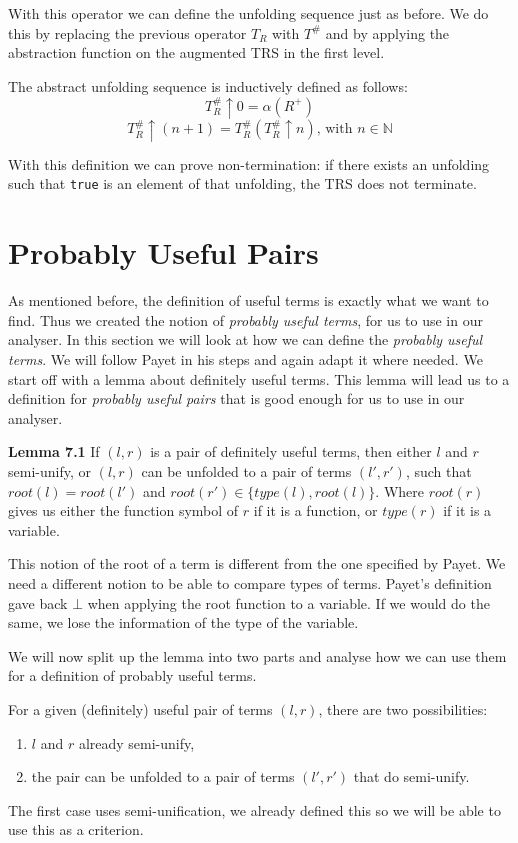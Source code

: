 With this operator we can define the unfolding sequence just as before. We do this by replacing the previous operator $T_R$ with $T^{\#}$ and by applying the abstraction function on the augmented TRS in the first level. 
\begin{definition}
The abstract unfolding sequence is inductively defined as follows:
$$T^{\#}_R \uparrow 0 = \alpha(R^+)$$
$$T^{\#}_R \uparrow (n+1) = T^{\#}_R(T^{\#}_R \uparrow n)\text{, with }n \in \mathbb{N}$$ 
\end{definition}

With this definition we can prove non-termination: if there exists an unfolding such that \texttt{true} is an element of that unfolding, the TRS does not terminate. 

\section{Probably Useful Pairs}
As mentioned before, the definition of useful terms is exactly what we want to find. Thus we created the notion of \textit{probably useful terms}, for us to use in our analyser. In this section we will look at how we can define the \textit{probably useful terms}. We will follow Payet in his steps and again adapt it where needed. We start off with a lemma about definitely useful terms. This lemma will lead us to a definition for \textit{probably useful pairs} that is good enough for us to use in our analyser. 

\textbf{Lemma 7.1} If $(l, r)$ is a pair of definitely useful terms, then either $l$ and $r$ semi-unify, or $(l, r)$ can be unfolded to a pair of terms $(l', r')$, such that $\textit{root}(l) = \textit{root}(l')$ and $\textit{root}(r') \in \{ \textit{type}(l), \textit{root}(l) \}$. Where $\textit{root}(r)$ gives us either the function symbol of $r$ if it is a function, or $\textit{type}(r)$ if it is a variable. 

This notion of the root of a term is different from the one specified by Payet. We need a different notion to be able to compare types of terms. Payet's definition gave back $\bot$ when applying the root function to a variable. If we would do the same, we lose the information of the type of the variable.

We will now split up the lemma into two parts and analyse how we can use them for a definition of probably useful terms. 

For a given (definitely) useful pair of terms $(l, r)$, there are two possibilities: 
\begin{enumerate}
    \itemsep 0em
    \item $l$ and $r$ already semi-unify,
    \item the pair can be unfolded to a pair of terms $(l', r')$ that do semi-unify.
\end{enumerate} 
The first case uses semi-unification, we already defined this so we will be able to use this as a criterion. 

